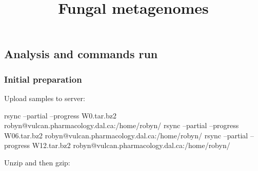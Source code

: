 \documentclass[
]{article}
\title{Fungal metagenomes}
\author{}
\date{\vspace{-2.5em}}
\newenvironment{Shaded}{\begin{snugshade}}{\end{snugshade}}
\newcommand{\ExtensionTok}[1]{#1}
\newcommand{\FunctionTok}[1]{\textcolor[rgb]{0.00,0.00,0.00}{#1}}
\newcommand{\KeywordTok}[1]{\textcolor[rgb]{0.13,0.29,0.53}{\textbf{#1}}}
\newcommand{\NormalTok}[1]{#1}
\newcommand{\VariableTok}[1]{\textcolor[rgb]{0.00,0.00,0.00}{#1}}
\begin{document}
\maketitle

{
\setcounter{tocdepth}{2}
\tableofcontents
}
\hypertarget{analysis-and-commands-run}{%
\subsection{Analysis and commands run}\label{analysis-and-commands-run}}

\hypertarget{initial-preparation}{%
\subsubsection{Initial preparation}\label{initial-preparation}}

Upload samples to server:

\begin{Shaded}
\begin{Highlighting}[]
\FunctionTok{rsync}\NormalTok{ --partial --progress W0.tar.bz2 robyn@vulcan.pharmacology.dal.ca:/home/robyn/}
\FunctionTok{rsync}\NormalTok{ --partial --progress W06.tar.bz2 robyn@vulcan.pharmacology.dal.ca:/home/robyn/}
\FunctionTok{rsync}\NormalTok{ --partial --progress W12.tar.bz2 robyn@vulcan.pharmacology.dal.ca:/home/robyn/}
\end{Highlighting}
\end{Shaded}

Unzip and then gzip:

\begin{Shaded}
\end{Shaded}
\end{document}
